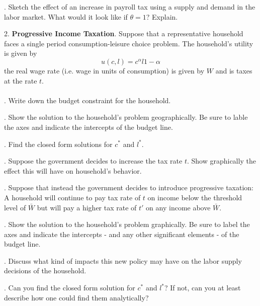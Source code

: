 \documentclass[11pt]{SelfArxOneColBMN}
\begin{document}
. Sketch the effect of an increase in payroll tax using a supply and demand in the labor market. What would it look like if $\theta = 1$? Explain.

2. \textbf{Progressive Income Taxation}. Suppose that a representative household faces a single period consumption-leisure choice problem. The household's utility is given by
\begin{equation}
	u(c,l) = c^\alpha l{1 - \alpha}
\end{equation}
the real wage rate (i.e. wage in units of consumption) is given by $W$ and is taxes at the rate $t$.\\
\\
. Write down the budget constraint for the household.

. Show the solution to the household's problem geographically. Be sure to lable the axes and indicate the intercepts of the budget line.

. Find the closed form solutions for $c^*$ and $l^*$.

. Suppose the government decides to increase the tax rate $t$. Show graphically the effect this will have on household's behavior. 

. Suppose that instead the government decides to introduce progressive taxation: A household will continue to pay tax rate of $t$ on income below the threshold level of $\bar{W}$ but will pay a higher tax rate of $t'$ on any income above $\bar{W}$. 

. Show the solution to the household's problem graphically. Be sure to label the axes and indicate the intercepts - and any other significant elements - of the budget line.

. Discuss what kind of impacts this new policy may have on the labor supply decisions of the household.

. Can you find the closed form solution for $c^*$ and $l^*$? If not, can you at least describe how one could find them analytically?
\end{document}
